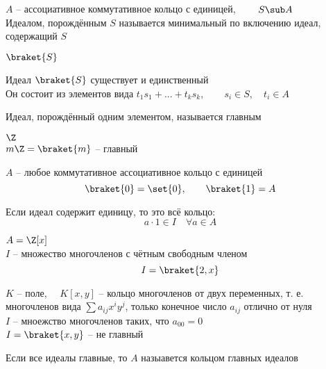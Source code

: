 \begin{definition}
	$ A $ -- ассоциативное коммутативное кольцо с единицей, $ \qquad S \sub A $ \\
	Идеалом, порождённым $ S $ называется минимальный по включению идеал, содержащий $ S $
\end{definition}

\begin{notation}
	$ \braket{S} $
\end{notation}

\begin{props}
	\item Идеал $ \braket{S} $ существует и единственный \\
	Он состоит из элементов вида $ t_1s_1 + ... + t_ks_k, \qquad s_i \in S, \quad t_i \in A $
\end{props}

\begin{definition}
	Идеал, порождённый одним элементом, называется главным
\end{definition}

\begin{exmpls}
	\item $ \Z $ \\
	$ m\Z = \braket{m} $ -- главный
	\item $ A $ -- любое коммутативное ассоциативное кольцо с единицей
	$$ \braket{0} = \set{0}, \qquad \braket{1} = A $$
	\begin{remark}
		Если идеал содержит единицу, то это всё кольцо:
		$$ a \cdot 1 \in I \quad \forall a \in A $$
	\end{remark}
	\item $ A = \Z[x] $ \\
	$ I $ -- множество многочленов с чётным свободным членом
	$$ I = \braket{2, x} $$
	\item $ K $ -- поле, $ \quad K[x, y] $ -- кольцо многочленов от двух переменных, т. е. многочленов вида $ \sum a_{ij}x^iy^j $, только конечное число $ a_{ij} $ отлично от нуля \\
	$ I $ -- мноежство многочленов таких, что $ a_{00} = 0 $ \\
	$ I = \braket{x, y} $ -- не главный
\end{exmpls}

\begin{definition}
	Если все идеалы главные, то $ A $ назыавется кольцом главных идеалов
\end{definition}

